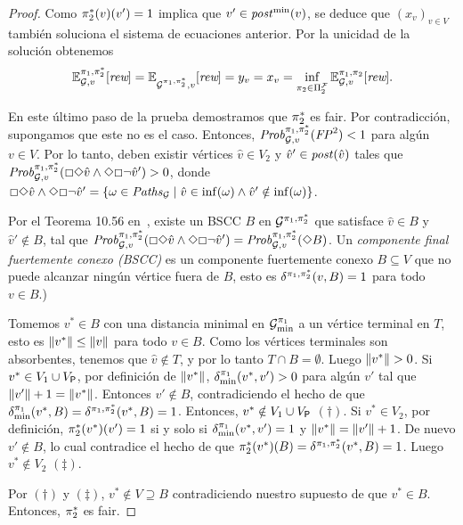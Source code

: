 \begin{proof}
  Como $\pi^*_{2}(v)(v') = 1$ implica que $v'\in\mathit{post}^{\min}(v)$,
  se deduce que $(x_v)_{v\in V}$ también soluciona el sistema de ecuaciones anterior.  Por la unicidad de la solución obtenemos
  \[\mathbb{E}^{\pi_{1}, \pi^*_{2}}_{\mathcal{G},v}[\textit{rew}] = 
    \mathbb{E}^{}_{\mathcal{G}^{\pi_{1},\pi^*_{2}},v}[\textit{rew}] =
    y_v = x_v =
    \inf_{\pi_{2} \in \Pi^{\mathcal{F}}_{2}} \mathbb{E}^{\pi_{1}, \pi_{2}}_{\mathcal{G},v}[\textit{rew}].
  \]

  En este último paso de la prueba demostramos que $\pi^*_{2}$ es fair.
  Por contradicción, supongamos que este no es el caso.  Entonces,
  $\mathit{Prob}^{\pi_{1}, \pi^*_{2}}_{\mathcal{G},v}(\mathit{FP}^2) < 1$ para algún
  $v\in V$.  Por lo tanto, deben existir vértices $\hat{v}\in V_2$
  y $\hat{v}'\in\mathit{post}(\hat{v})$ tales que 
  $\mathit{Prob}^{\pi_{1}, \pi^*_{2}}_{\mathcal{G},v}({\Box\Diamond\hat{v}}\land{\Diamond\Box\neg\hat{v}'})>0$,
  donde
  ${\Box\Diamond\hat{v}}\land{\Diamond\Box\neg\hat{v}'} =\{ {\omega\in\mathit{Paths}_{\mathcal{G}}} \mid {\hat{v} \in \inf(\omega)} \land {\hat{v}' \notin \inf(\omega)} \}$.

  Por el Teorema 10.56 en~\cite{BaierK08}, existe un BSCC
  $B$ en $\mathcal{G}^{\pi_{1},\pi^*_{2}}$ que satisface $\hat{v}\in
  B$ y $\hat{v}'\notin B$, tal que
  $\mathit{Prob}^{\pi_{1}, \pi^*_{2}}_{\mathcal{G},v}({\Box\Diamond\hat{v}}\land{\Diamond\Box\neg\hat{v}'})
  = \mathit{Prob}^{\pi_{1}, \pi^*_{2}}_{\mathcal{G},v}({\Diamond B})$.
%
  Un \emph{componente final fuertemente conexo (BSCC)} es un componente fuertemente conexo $B\subseteq V$ que no puede alcanzar ningún vértice fuera de $B$, esto es $\delta^{\pi_{1},\pi^*_{2}}(v,B)=1$
  para todo $v\in B$.)

  Tomemos $v^*\in B$ con una distancia minimal en
  $\mathcal{G}^{\pi_{1}}_{\min}$ a un vértice terminal en $T$, esto es
  ${\lVert{v^*}\rVert}\leq{\lVert{v}\rVert}$ para todo $v\in B$.  Como los vértices terminales son absorbentes, tenemos que $\hat{v}\notin T$, y por lo tanto
  $T\cap B=\emptyset$.  Luego ${\lVert{v^*}\rVert}>0$.
  Si $v^*\in V_1 \cup V_{\mathsf{P}}$, por definición de
  ${\lVert{v^*}\rVert}$, $\delta^{\pi_{1}}_{\min}(v^*,v')>0$
  para algún $v'$ tal que ${\lVert{v'}\rVert}+1={\lVert{v^*}\rVert}$. Entonces
  $v'\notin B$, contradiciendo el hecho de que
  $\delta^{\pi_{1}}_{\min}(v^*,B)=\delta^{\pi_{1},\pi^*_{2}}(v^*,B)=1$.
  Entonces, $v^*\notin V_1 \cup V_{\mathsf{P}}$ $(\dagger)$.
  Si $v^*\in V_2$, por definición,
  $\pi^*_{2}(v^*)(v')=1$ si y solo si
  $\delta^{\pi_{1}}_{\min}(v^*,v')=1$ y
  ${\lVert{v^*}\rVert}={\lVert{v'}\rVert}+1$. De nuevo $v'\notin B$, 
  lo cual contradice el hecho de que
  $\pi^*_{2}(v^*)(B)=\delta^{\pi_{1},\pi^*_{2}}(v^*,B)=1$.
  Luego $v^*\notin V_2$ $(\ddagger)$.
  
  Por $(\dagger)$ y $(\ddagger)$, $v^*\notin V \supseteq B$
  contradiciendo nuestro supuesto de que $v^*\in B$.  Entonces,
  $\pi^*_{2}$ es fair.
  \qedhere
\end{proof}

